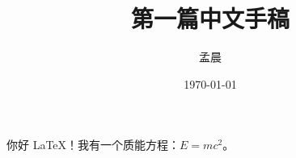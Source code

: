 \documentclass[a4paper, zihao = -4]{ctexart}
\title{第一篇中文手稿}
\author{孟晨}
\date{\today}
\begin{document}
\maketitle

你好 \LaTeX！我有一个质能方程：$E = mc^2$。
\end{document}
